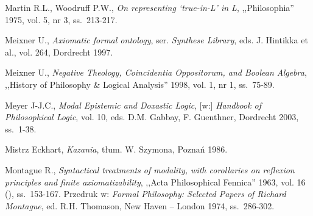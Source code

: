 \begin{thebibliography}{100}

Martin R.L., Woodruff P.W., \textit{On representing ‘true-in-L' in L}, ,,Philosophia'' 1975, vol. 5, nr 3, ss.~213-217.


Meixner U., \textit{Axiomatic formal ontology}, ser. \textit{Synthese Library}, eds. J. Hintikka et al., vol. 264, Dordrecht 1997.

Meixner U., \textit{Negative Theology, Coincidentia Oppositorum, and Boolean Algebra}, ,,History of Philosophy \& Logical Analysis'' 1998, vol. 1, nr 1, ss.~75-89.


Meyer J-J.C., \textit{Modal Epistemic and Doxastic Logic}, [w:] \textit{Handbook of Philosophical Logic}, vol. 10, eds. D.M. Gabbay, F. Guenthner, Dordrecht 2003, ss.~1-38.



Mistrz Eckhart, \textit{Kazania}, tłum. W. Szymona, Poznań 1986.

Montague R., \textit{Syntactical treatments of modality, with corollaries on reflexion principles and finite axiomatizability}, ,,Acta Philosophical Fennica'' 1963, vol. 16 (), ss.~153-167.
Przedruk w: \textit{Formal Philosophy: Selected Papers of Richard Montague}, ed. R.H. Thomason, New Haven -- London 1974, ss.~286-302.


\end{thebibliography}
